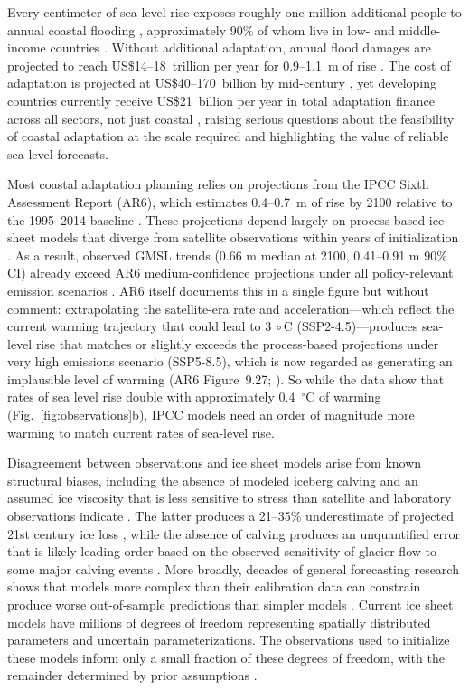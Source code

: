 \documentclass[12pt]{article}
\begin{document}
Every centimeter of sea-level rise exposes roughly one million additional people to annual coastal flooding \citep{Kulp2019}, approximately 90\% of whom live in low- and middle-income countries \citep{Jongman2012}. Without additional adaptation, annual flood damages are projected to reach US\$14--18~trillion per year for 0.9--1.1~m of rise \citep{Jevrejeva2018}. The cost of adaptation is projected at US\$40--170~billion by mid-century \citep{Tiggeloven2020}, yet developing countries currently receive US\$21~billion per year in total adaptation finance across all sectors, not just coastal \citep{UNEP2023}, raising serious questions about the feasibility of coastal adaptation at the scale required and highlighting the value of reliable sea-level forecasts.

Most coastal adaptation planning relies on projections from the IPCC Sixth Assessment Report (AR6), which estimates 0.4--0.7~m of rise by 2100 relative to the 1995--2014 baseline \citep{Fox-Kemper2021, Hirschfeld2023}. These projections depend largely on process-based ice sheet models that diverge from satellite observations within years of initialization \citep{Aschwanden2021, Fricker2025}. As a result, observed GMSL trends (0.66 m median at 2100, 0.41--0.91 m 90\% CI) already exceed AR6 medium-confidence projections under all policy-relevant emission scenarios \citep{Hamlington2022, Hamlington2024}. AR6 itself documents this in a single figure but without comment: extrapolating the satellite-era rate and acceleration---which reflect the current warming trajectory that could lead to $3\ \circ$C (SSP2-4.5)---produces sea-level rise that matches or slightly exceeds the process-based projections under very high emissions scenario (SSP5-8.5), which is now regarded as generating an implausible level of warming (AR6 Figure~9.27; \citep{Fox-Kemper2021,Hausfather2020}). So while the data show that rates of sea level rise double with approximately 0.4~$^\circ$C of warming (Fig.~\ref{fig:observations}b), IPCC models need an order of magnitude more warming to match current rates of sea-level rise. 

Disagreement between observations and ice sheet models arise from known structural biases, including the absence of modeled iceberg calving \citep{Fricker2025} and an assumed ice viscosity that is less sensitive to stress than satellite and laboratory observations indicate \citep{Millstein2022,Ranganathan2024}. The latter produces a 21--35\% underestimate of projected 21st century ice loss \citep{GetraerMorlighem2025, Martin2026}, while the absence of calving produces an unquantified error that is likely leading order based on the observed sensitivity of glacier flow to some major calving events \citep{Scambos2004}. More broadly, decades of general forecasting research shows that models more complex than their calibration data can constrain produce worse out-of-sample predictions than simpler models \citep{Green2015, Makridakis2020}. Current ice sheet models have millions of degrees of freedom representing spatially distributed parameters and uncertain parameterizations. The observations used to initialize these models inform only a small fraction of these degrees of freedom, with the remainder determined by prior assumptions \citep{Isaac2015, Petra2014}. 
\end{document}
